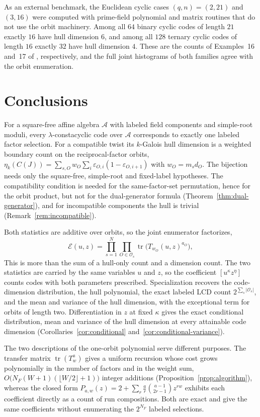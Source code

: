 \documentclass[10pt,a4paper]{article}
\newcommand{\A}{\mathcal A}
\newcommand{\Os}{\mathcal O_s}
\newcommand{\Epoly}{\mathscr E}
\numberwithin{equation}{section}
\theoremstyle{plain}
\theoremstyle{definition}
\theoremstyle{remark}
\begin{document}
As an external benchmark, the Euclidean cyclic cases $(q,n)=(2,21)$ and
$(3,16)$ were computed with prime-field polynomial and matrix routines that do
not use the orbit machinery. Among all $64$ binary cyclic codes of length $21$
exactly $16$ have hull dimension $6$, and among all $128$ ternary cyclic codes of
length $16$ exactly $32$ have hull dimension $4$. These are the counts of
Examples~16 and~17 of \cite{sangwisut2015}, respectively, and the full joint
histograms of both families agree with the orbit enumeration.

\section{Conclusions}\label{sec:conclusion}

For a square-free affine algebra $\A$ with labeled field components and
simple-root moduli, every $\lambda$-constacyclic code over $\A$ corresponds to
exactly one labeled factor selection. For a compatible twist its $k$-Galois
hull dimension is a weighted boundary count on the reciprocal-factor orbits,
$\eta_k(C(J))=\sum_{s,O}w_O\sum_i\varepsilon_{O,i}(1-\varepsilon_{O,i+1})$ with
$w_O=m_sd_O$. The bijection needs only the square-free, simple-root and
fixed-label hypotheses.
The compatibility condition is needed for the same-factor-set permutation, hence
for the orbit product, but not for the dual-generator formula
(Theorem~\ref{thm:dual-generator}), and for incompatible components the hull is
trivial (Remark~\ref{rem:incompatible}).

Both statistics are additive over orbits, so the joint enumerator factorizes,
\[
\Epoly(u,z)=\prod_{s=1}^{N}\prod_{O\in\Os}
\operatorname{tr}\bigl(T_{w_O}(u,z)^{a_O}\bigr),
\]
This is more than the sum of a hull-only count and a dimension count. The two
statistics are carried by the same variables $u$ and $z$, so the coefficient
$[u^{\kappa}z^{\eta}]$ counts codes with both parameters prescribed.
Specialization recovers the code-dimension distribution, the hull polynomial,
the exact labeled LCD count $2^{\sum_s|\Os|}$, and the mean and variance of the
hull dimension, with the exceptional term for orbits of length two.
Differentiation in $z$ at fixed $\kappa$ gives the exact conditional
distribution, mean and variance of the hull dimension at every attainable code
dimension (Corollaries~\ref{cor:conditional}
and~\ref{cor:conditional-variance}).

The two descriptions of the one-orbit polynomial serve different purposes. The
transfer matrix $\operatorname{tr}(T_w^{a})$ gives a uniform recursion whose cost
grows polynomially in the number of factors and in the weight sum,
$O\bigl(N_F(W+1)(\lfloor W/2\rfloor+1)\bigr)$ integer additions
(Proposition~\ref{prop:algorithm}), whereas the closed form
$P_{a,w}(z)=2+\sum_r\frac{a}{r}\binom{a-1}{2r-1}z^{rw}$ exhibits each coefficient
directly as a count of run compositions. Both are exact and give the same
coefficients without enumerating the $2^{N_F}$ labeled selections.
\end{document}
